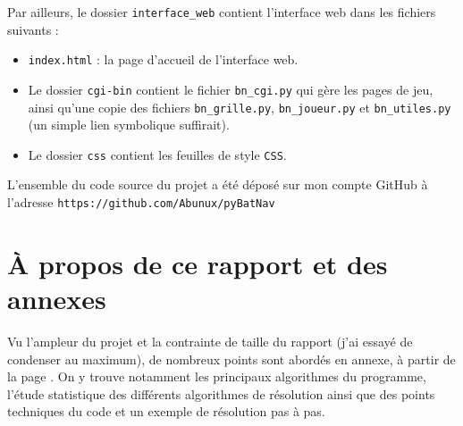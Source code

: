 \medskip

Par ailleurs, le dossier \texttt{interface\_web} contient l'interface web dans les fichiers suivants :
\begin{itemize}
\item \texttt{index.html} : la page d'accueil de l'interface web.
\item Le dossier \texttt{cgi-bin} contient le fichier \texttt{bn\_cgi.py} qui gère les pages de jeu, ainsi qu'une copie des fichiers \texttt{bn\_grille.py}, \texttt{bn\_joueur.py} et \texttt{bn\_utiles.py} (un simple lien symbolique suffirait).
\item Le dossier \texttt{css} contient les feuilles de style \texttt{CSS}.
\end{itemize}

\bigskip

L'ensemble du code source du projet a été déposé sur mon compte GitHub à l'adresse \texttt{https://github.com/Abunux/pyBatNav}

\section{À propos de ce rapport et des annexes}
Vu l'ampleur du projet et la contrainte de taille du rapport (j'ai essayé de condenser au maximum), de nombreux points sont abordés en annexe, à partir de la page \pageref{annexes}. On y trouve notamment les principaux algorithmes du programme, l'étude statistique des différents algorithmes de résolution ainsi que des points techniques du code et un exemple de résolution pas à pas.
